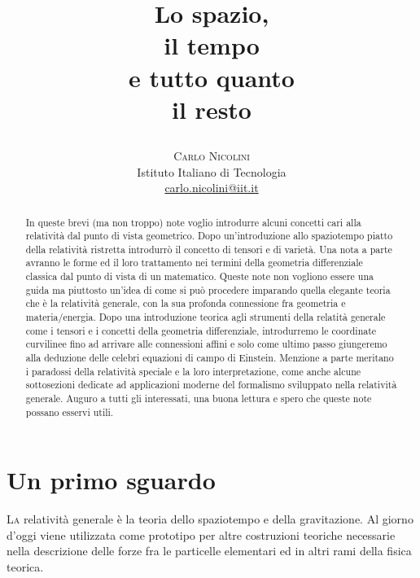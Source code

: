 \documentclass[twoside]{article}
\title{
\begin{flushleft}
\vspace{-15mm}\fontsize{48pt}{8pt}\selectfont\textbf{Lo spazio,\\ il tempo\\ e tutto quanto\\ il resto}
\end{flushleft}
} %
\author{
\large
\textsc{Carlo Nicolini}\\[2mm] %
\normalsize Istituto Italiano di Tecnologia \\ %
\normalsize \href{mailto:carlo.nicolini@iit.it}{carlo.nicolini@iit.it} %
\vspace{-5mm}
}
\date{}
\begin{document}
\maketitle %
\thispagestyle{fancy} %


\begin{abstract}
\noindent
In queste brevi (ma non troppo) note voglio introdurre alcuni concetti cari alla relatività dal punto di vista geometrico. Dopo un'introduzione allo spaziotempo piatto della relatività ristretta introdurrò il concetto di tensori e di varietà. Una nota a parte avranno le forme ed il loro trattamento nei termini della geometria differenziale classica dal punto di vista di un matematico. Queste note non vogliono essere una guida ma piuttosto un'idea di come si può procedere imparando quella elegante teoria che è la relatività generale, con la sua profonda connessione fra geometria e materia/energia. Dopo una introduzione teorica agli strumenti della relatità generale come i tensori e i concetti della geometria differenziale, introdurremo le coordinate curvilinee fino ad arrivare alle connessioni affini e solo come ultimo passo giungeremo alla deduzione delle celebri equazioni di campo di Einstein. Menzione a parte meritano i paradossi della relatività speciale e la loro interpretazione, come anche alcune sottosezioni dedicate ad applicazioni moderne del formalismo sviluppato nella relatività generale.
Auguro a tutti gli interessati, una buona lettura e spero che queste note possano esservi utili.
\end{abstract}


\section{Un primo sguardo}

\lettrine[nindent=0em,lines=3]{L}a relatività generale è la teoria dello spaziotempo e della gravitazione. Al giorno d'oggi viene utilizzata come prototipo per altre costruzioni teoriche necessarie nella descrizione delle forze fra le particelle elementari ed in altri rami della fisica teorica. 
\end{document}
